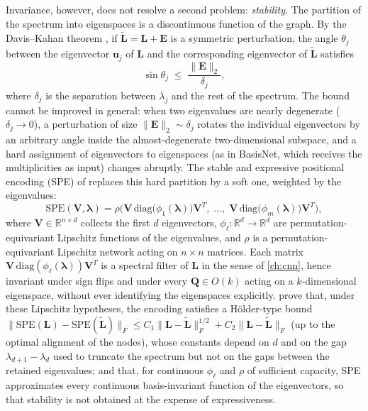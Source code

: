 Invariance, however, does not resolve a second problem: \emph{stability}. The partition of the spectrum into eigenspaces is a discontinuous function of the graph. By the Davis--Kahan theorem \citep{davis1970rotation}, if $\tilde{\mathbf{L}} = \mathbf{L} + \mathbf{E}$ is a symmetric perturbation, the angle $\theta_j$ between the eigenvector $\mathbf{u}_j$ of $\mathbf{L}$ and the corresponding eigenvector of $\tilde{\mathbf{L}}$ satisfies
\begin{equation}
    \sin \theta_j \;\leq\; \frac{\|\mathbf{E}\|_2}{\delta_j},
    \label{eq:davis_kahan}
\end{equation}
where $\delta_j$ is the separation between $\lambda_j$ and the rest of the spectrum. The bound cannot be improved in general: when two eigenvalues are nearly degenerate ($\delta_j \to 0$), a perturbation of size $\|\mathbf{E}\|_2 \sim \delta_j$ rotates the individual eigenvectors by an arbitrary angle inside the almost-degenerate two-dimensional subspace, and a hard assignment of eigenvectors to eigenspaces (as in BasisNet, which receives the multiplicities as input) changes abruptly. The stable and expressive positional encoding (SPE) of \citet{huang2024spe} replaces this hard partition by a soft one, weighted by the eigenvalues:
\begin{equation}
    \text{SPE}(\mathbf{V}, \boldsymbol{\lambda}) = \rho\Big( \mathbf{V}\,\text{diag}\big(\phi_1(\boldsymbol{\lambda})\big)\mathbf{V}^T, \; \ldots, \; \mathbf{V}\,\text{diag}\big(\phi_m(\boldsymbol{\lambda})\big)\mathbf{V}^T \Big),
    \label{eq:spe}
\end{equation}
where $\mathbf{V} \in \mathbb{R}^{n \times d}$ collects the first $d$ eigenvectors, $\phi_\ell: \mathbb{R}^d \to \mathbb{R}^d$ are permutation-equivariant Lipschitz functions of the eigenvalues, and $\rho$ is a permutation-equivariant Lipschitz network acting on $n \times n$ matrices. Each matrix $\mathbf{V}\,\text{diag}(\phi_\ell(\boldsymbol{\lambda}))\mathbf{V}^T$ is a spectral filter of $\mathbf{L}$ in the sense of \autoref{ch:cnn}, hence invariant under sign flips and under every $\mathbf{Q} \in O(k)$ acting on a $k$-dimensional eigenspace, without ever identifying the eigenspaces explicitly. \citet{huang2024spe} prove that, under these Lipschitz hypotheses, the encoding satisfies a Hölder-type bound $\|\text{SPE}(\mathbf{L}) - \text{SPE}(\tilde{\mathbf{L}})\|_F \leq C_1 \|\mathbf{L} - \tilde{\mathbf{L}}\|_F^{1/2} + C_2 \|\mathbf{L} - \tilde{\mathbf{L}}\|_F$ (up to the optimal alignment of the nodes), whose constants depend on $d$ and on the gap $\lambda_{d+1} - \lambda_d$ used to truncate the spectrum but not on the gaps between the retained eigenvalues; and that, for continuous $\phi_\ell$ and $\rho$ of sufficient capacity, SPE approximates every continuous basis-invariant function of the eigenvectors, so that stability is not obtained at the expense of expressiveness.

